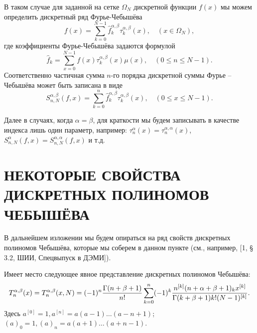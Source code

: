 \documentclass[12pt]{book}
\begin{document}
В таком случае для заданной на сетке $\Omega_N$ дискретной функции $f(x)$ мы можем определить дискретный ряд Фурье-Чебыш\"ева
\begin{equation}
\label{sms2eq1}
f(x)=\sum\limits_{k=0}^{N-1}\hat{f}^{\alpha,\beta}_k\tau_{k}^{\alpha,\beta}(x),\quad (x \in \Omega_N),
\end{equation}
где коэффициенты Фурье-Чебыш\"ева задаются формулой
\begin{equation}
\label{sms2eq2}
\hat{f}_k = \sum\limits_{x=0}^{N-1}f(x)\tau_{k}^{\alpha,\beta}(x)\mu(x),\quad (0\le n\le N-1).
\end{equation}
Соответственно частичная сумма $n$-го порядка дискретной суммы Фурье -- Чебыш\"ева может быть записана в виде
\begin{equation}
\label{sms2eq5}
S_{n,N}^{\alpha,\beta}(f,x) = \sum\limits_{k=0}^{n}\hat{f}^{\alpha,\beta}_k \tau_{k}^{\alpha,\beta}(x),\quad (0\le x\le N-1).
\end{equation}

Далее в случаях, когда $\alpha = \beta$, для краткости мы будем записывать в качестве индекса лишь один параметр, например: $\tau_{n}^{\alpha}(x) = \tau_{n}^{\alpha,\alpha}(x)$, $S_{n,N}^{\alpha}(f,x) = S_{n,N}^{\alpha,\alpha}(f,x)$ и т.д.





\section*{НЕКОТОРЫЕ СВОЙСТВА ДИСКРЕТНЫХ ПОЛИНОМОВ ЧЕБЫШ\"ЕВА}

В дальнейшем изложении мы будем опираться на ряд свойств дискретных полиномов Чебыш\"ева, которые мы соберем в данном пункте (см., например, [1, \S\,3.2, ШИИ, Спецвыпуск в ДЭМИ]).

Имеет место следующее явное представление дискретных полиномов Чебыш\"ева:
\begin{equation}
\label{sms2eq3}
T_{n}^{\alpha,\beta}(x) = T_{n}^{\alpha,\beta}(x,N)=(-1)^n{\Gamma(n+\beta+1)\over n!}\sum_{k=0}^n (-1)^k
{n^{[k]}(n+\alpha+\beta+1)_kx^{[k]}\over \Gamma(k+\beta+1)
k!(N-1)^{[k]}}.
\end{equation}
Здесь $a^{[0]}=1, a^{[n]}=a(a-1)\ldots (a-n+1)$; $(a)_0=1, (a)_n=a(a+1)\ldots(a+n-1)$.
\end{document}
